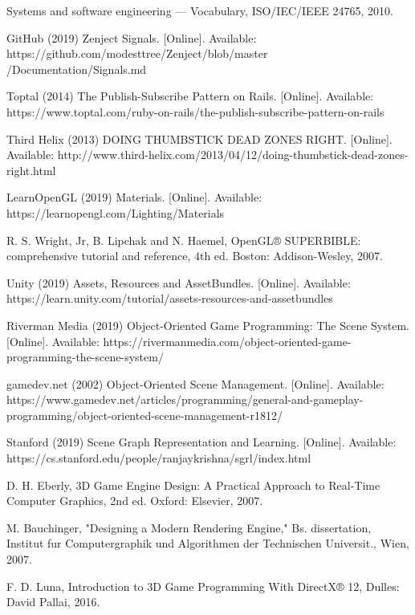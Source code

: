 \begin{thebibliography}{1}
Systems and software engineering — Vocabulary, ISO/IEC/IEEE 24765, 2010.

GitHub (2019) Zenject Signals. [Online]. Available: https://github.com/modesttree/Zenject/blob/master
/Documentation/Signals.md

Toptal (2014) The Publish-Subscribe Pattern on Rails. [Online]. Available: https://www.toptal.com/ruby-on-rails/the-publish-subscribe-pattern-on-rails

Third Helix (2013) DOING THUMBSTICK DEAD ZONES RIGHT. [Online]. Available: http://www.third-helix.com/2013/04/12/doing-thumbstick-dead-zones-right.html

LearnOpenGL (2019) Materials. [Online]. Available: https://learnopengl.com/Lighting/Materials

R. S. Wright, Jr, B. Lipchak and N. Haemel, OpenGL® SUPERBIBLE: comprehensive tutorial and reference, 4th ed. Boston: Addison-Wesley, 2007.

Unity (2019) Assets, Resources and AssetBundles. [Online]. Available: https://learn.unity.com/tutorial/assets-resources-and-assetbundles

Riverman Media (2019) Object-Oriented Game Programming: The Scene System. [Online]. Available: https://rivermanmedia.com/object-oriented-game-programming-the-scene-system/

gamedev.net (2002) Object-Oriented Scene Management. [Online]. Available: https://www.gamedev.net/articles/programming/general-and-gameplay-programming/object-oriented-scene-management-r1812/

Stanford (2019) Scene Graph Representation and Learning. [Online]. Available: https://cs.stanford.edu/people/ranjaykrishna/sgrl/index.html

D. H. Eberly, 3D Game Engine Design: A Practical Approach to Real-Time Computer Graphics, 2nd ed. Oxford: Elsevier, 2007.

M. Bauchinger, "Designing a Modern Rendering Engine," Bs. dissertation, Institut fur Computergraphik und Algorithmen der Technischen Universit., Wien, 2007.

F. D. Luna, Introduction to 3D Game Programming With DirectX® 12, Dulles: David	Pallai, 2016.


\end{thebibliography}
